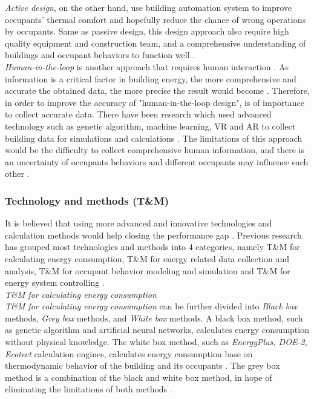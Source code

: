 \documentclass[11pt, a4paper]{article}
\theoremstyle{definition}
\begin{document}
			\textit{Active design}, on the other hand, use building automation system to improve occupants' thermal comfort and hopefully reduce the chance of wrong operations by occupants. Same as passive design, this design approach also require high quality equipment and construction team, and a comprehensive understanding of buildings and occupant behaviors to function well \cite{DEWILDE201440}.\\

			\textit{Human-in-the-loop} is another approach that requires human interaction \cite{karwowski2001international}. As information is a critical factor in building energy, the more comprehensive and accurate the obtained data, the more precise the result would become \cite{NIU2016275}. Therefore, in order to improve the accuracy of "human-in-the-loop design", is of importance to collect accurate data. There have been research which used advanced technology such as genetic algorithm, machine learning, VR and AR to collect building data for simulations and calculations \cite{karwowski2001international}. The limitations of this approach would be the difficulty to collect comprehensive human information, and there is an uncertainty of occupants behaviors and different occupants may influence each other \cite{masoso2010dark}.

		\subsubsection{Technology and methods (T\&M)}

			It is believed that using more advanced and innovative technologies and calculation methods would help closing the performance gap \cite{ZOU2018165}. Previous research has grouped most technologies and methods into 4 categories, namely T\&M for calculating energy consumption, T\&M for energy related data collection and analysis, T\&M for occupant behavior modeling and simulation and T\&M for energy system controlling \cite{ZOU2018165}.\\

			\textit{T\&M for calculating energy consumption}\\

			\textit{T\&M for calculating energy consumption} can be further divided into \textit{Black box} methods, \textit{Grey box} methods, and \textit{White box} methods. A black box method, such as genetic algorithm and artificial neural networks, calculates energy consumption without physical knowledge. The white box method, such as \textit{EnergyPlus, DOE-2, Ecotect} calculation engines, calculates energy consumption base on thermodynamic behavior of the building and its occupants \cite{li2014methods,xu2007optimal}. The grey box method is a combination of the black and white box method, in hope of eliminating the limitations of both methods \cite{ZOU2018165}.\\
\end{document}
